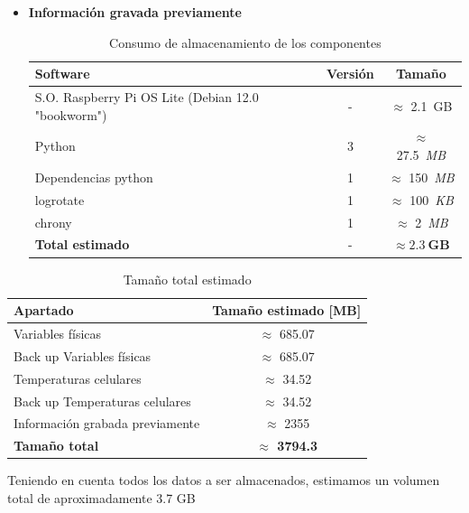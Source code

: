 \begin{itemize}
      \item \textbf{Información gravada previamente}

      \begin{table}[H]
      \centering
      \begin{tabular}{|l|c|c|}
      \hline
      \textbf{Software} & \textbf{Versión} & \textbf{Tamaño} \\
      \hline
      S.O. Raspberry Pi OS Lite (Debian 12.0 "bookworm") & - & $\approx$ 2.1~GB \\
      Python                   & 3 & $\approx$ 27.5~\textit{MB} \\
      Dependencias python      & 1 & $\approx$ 150~\textit{MB} \\
      logrotate                & 1 & $\approx$ 100~\textit{KB} \\
      chrony                   & 1 & $\approx$ 2~\textit{MB} \\
      \hline
      \textbf{Total estimado}  & - & $\boldsymbol{\approx 2.3~GB}$ \\
      \hline
      \end{tabular}
      \caption{Consumo de almacenamiento de los componentes}
      \label{tab:almacenamiento_componentes}
      \end{table}
  
    \end{itemize}
    
  \begin{table}[H]
    \centering
    \begin{tabular}{|l|c|}
    \hline
    \textbf{Apartado} & \textbf{Tamaño estimado [MB]} \\
    \hline
    Variables físicas              & $\approx$ 685.07 \\
    Back up Variables físicas      & $\approx$ 685.07 \\
    Temperaturas celulares         & $\approx$ 34.52  \\
    Back up Temperaturas celulares & $\approx$ 34.52  \\
    Información grabada previamente & $\approx$ 2355 \\
    \hline
    \textbf{Tamaño total}          & \textbf{ $\approx$ 3794.3} \\
    \hline
    \end{tabular}
    \caption{Tamaño total estimado}
    \label{tab:tamano_total_estimado}
    \end{table}

    Teniendo en cuenta todos los datos a ser almacenados, estimamos un volumen total de
    aproximadamente 3.7 GB

